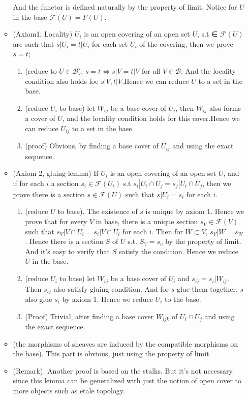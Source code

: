 \documentclass[11pt]{article}
\begin{document}
\begin{itemize}
\begin{itemize}
    And the functor is defined naturally by the property of limit. Notice for $U$ in the base $\mathcal{F}(U)=F(U)$.
  \item (Axiom1, Locality) $U_i$ is an open covering of an open set $U$, s.t ∈ $\mathcal{F}(U)$ are such that $s|U_i = t|U_i$ for each set $U_i$ of the covering, then we prove $s = t$;
    \begin{enumerate}
    \item (reduce to $U\in \mathcal{B}$). $s=t \Leftrightarrow s|V=t|V$ for all $V \in \mathcal{B}$. And the locality condition also holds foe $s|V, t|V$.Hence we can reduce $U$ to a set in the base.
    \item(reduce $U_i$ to base) let $W_{ij}$ be a base cover of $U_i$, then $W_{ij}$ also forms a cover of $U$, and the locality condition holds for this cover.Hence we can reduce $U_{ij}$ to a set in the base.
    \item(proof) Obvious, by finding a base cover of $U_{ij}$ and using the exact sequence.
    \end{enumerate}
  \item (Axiom 2, gluing lemma) If $U_i$ is an open covering of an open set $U$, and if for each $i$ a section $s_i \in \mathcal{F}(U_i)$ s.t $s_i|U_i\cap U_j = s_j|U_i\cap U_j$, then we prove there is a section $s \in \mathcal{F}(U)$ such that $s|U_i = s_i$ for each i. 
    \begin{enumerate}
    \item (reduce $U$ to base). The existence of $s$ is unique by axiom 1. Hence we prove that for every $V$ in base, there is a unique section $s_V \in \mathcal{F}(V)$ such that $s_V|V\cap U_i = s_i|V\cap U_i$ for each i. Then for $W \subset V$, $s_V|W=s_W$. Hence there is a section $S$ of $U$ s.t. $S_V=s_v$ by the property of limit. And it's easy to verify that $S$ satisfy the condition. Hence we reduce $U$ in the base.
    \item (reduce $U_i$ to base) let $W_{ij}$ be a base cover of $U_{i}$ and $s_{ij}=s_i|W_{ij}$. Then $s_{ij}$ also satisfy gluing condition. And for $s$ glue them together, $s$ also glue $s_i$ by axiom 1. Hence we reduce $U_i$ to the base.
    \item (Proof) Trivial, after finding a base cover $W_{ijk}$ of $U_i\cap U_j$ and using the exact sequence.
    \end{enumerate}
  \item (the morphisms of sheaves are induced by the compatible morphisms on the base). This part is obvious, just using the property of limit. 
  \item(Remark). Another proof is based on the stalks. But it's not necessary since this lemma can be generalized with just the notion of open cover to more objects such as etale topology. 
  \end{itemize}



\end{itemize}
\end{document}
